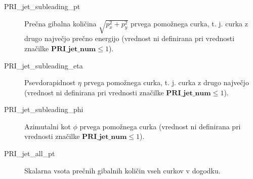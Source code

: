 \documentclass[11pt,a4paper,openany]{book}
\begin{document}
\begin{changemargin}{0.5cm}{0.0cm}
\begin{description}
	\item[PRI\_jet\_subleading\_pt] Prečna gibalna količina $\sqrt{p_x^2 + p_y^2}$ prvega pomožnega curka, t. j. curka z drugo največjo prečno energijo (vrednost ni definirana pri vrednosti značilke $\textbf{PRI\_jet\_num} \le 1$).
	\item[PRI\_jet\_subleading\_eta] Psevdorapidnost $\eta$ prvega pomožnega curka, t. j. curka z drugo največjo (vrednost ni definirana pri vrednosti značilke $\textbf{PRI\_jet\_num} \le 1$).
	\item[PRI\_jet\_subleading\_phi] Azimutalni kot $\phi$ prvega pomožnega curka (vrednost ni definirana pri vrednosti značilke $\textbf{PRI\_jet\_num} \le 1$).
	
	\item[PRI\_jet\_all\_pt] Skalarna vsota prečnih gibalnih količin vseh curkov v dogodku.
\end{description}
\end{changemargin}
\end{document}
